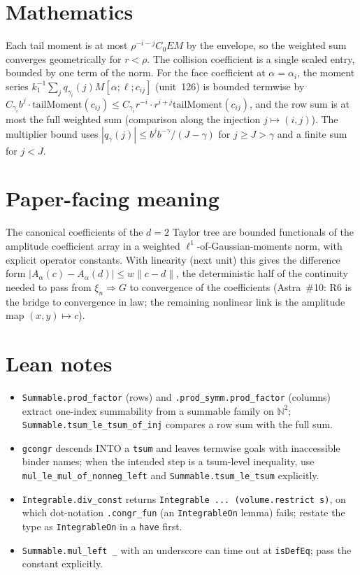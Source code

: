 \documentclass[11pt]{article}
\begin{document}
\section{Mathematics}

Each tail moment is at most $\rho^{-i-j}C_0EM$ by the envelope, so the weighted sum converges
geometrically for $r<\rho$. The collision coefficient is a single scaled entry, bounded by one
term of the norm. For the face coefficient at $\alpha=\alpha_i$, the moment series
$k_1^{-1}\sum_jq_{\gamma_i}(j)M[\alpha;\ell;c_{ij}]$ (unit~126) is bounded termwise by
$C_{\gamma_i}b^j\cdot\mathrm{tailMoment}(c_{ij})\le C_{\gamma_i}r^{-i}\cdot r^{i+j}\mathrm{tailMoment}(c_{ij})$,
and the row sum is at most the full weighted sum (comparison along the injection $j\mapsto(i,j)$).
The multiplier bound uses $|q_\gamma(j)|\le b^jb^{-\gamma}/(J-\gamma)$ for $j\ge J>\gamma$ and a
finite sum for $j<J$.

\section{Paper-facing meaning}

The canonical coefficients of the $d=2$ Taylor tree are bounded functionals of the amplitude
coefficient array in a weighted $\ell^1$-of-Gaussian-moments norm, with explicit operator constants.
With linearity (next unit) this gives the difference form $|A_\alpha(c)-A_\alpha(d)|\le w\|c-d\|$,
the deterministic half of the continuity needed to pass from $\xi_n\Rightarrow G$ to convergence of
the coefficients (Astra~\#10: R6 is the bridge to convergence in law; the remaining nonlinear link is
the amplitude map $(x,y)\mapsto c$).

\section{Lean notes}

\begin{itemize}
\item \texttt{Summable.prod\_factor} (rows) and \texttt{.prod\_symm.prod\_factor} (columns)
extract one-index summability from a summable family on $\mathbb N^2$;
\texttt{Summable.tsum\_le\_tsum\_of\_inj} compares a row sum with the full sum.
\item \texttt{gcongr} descends INTO a \texttt{tsum} and leaves termwise goals with inaccessible
binder names; when the intended step is a tsum-level inequality, use
\texttt{mul\_le\_mul\_of\_nonneg\_left} and \texttt{Summable.tsum\_le\_tsum} explicitly.
\item \texttt{Integrable.div\_const} returns \texttt{Integrable ... (volume.restrict s)}, on which
dot-notation \texttt{.congr\_fun} (an \texttt{IntegrableOn} lemma) fails; restate the type as
\texttt{IntegrableOn} in a \texttt{have} first.
\item \texttt{Summable.mul\_left \_} with an underscore can time out at \texttt{isDefEq}; pass
the constant explicitly.
\end{itemize}
\end{document}
